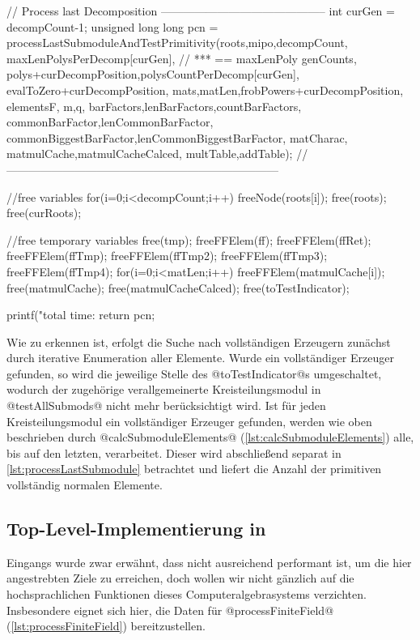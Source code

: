 \begin{ccode}[caption={Aus \url{../Sage/enumeratePCNs.c}},
  label=lst:processFiniteField]
{    // Process last Decomposition --------------------------------------------
    int curGen = decompCount-1;
    unsigned long long pcn = 
        processLastSubmoduleAndTestPrimitivity(roots,mipo,decompCount,
            maxLenPolysPerDecomp[curGen],  // *** == maxLenPoly
            genCounts,
            polys+curDecompPosition,polysCountPerDecomp[curGen],
            evalToZero+curDecompPosition,
            mats,matLen,frobPowers+curDecompPosition,
            elementsF,
            m,q,
            barFactors,lenBarFactors,countBarFactors,
            commonBarFactor,lenCommonBarFactor,
            commonBiggestBarFactor,lenCommonBiggestBarFactor,
            matCharac,
            matmulCache,matmulCacheCalced,
            multTable,addTable);
    //------------------------------------------------------------------------

    //free variables
    for(i=0;i<decompCount;i++)
        freeNode(roots[i]);
    free(roots); free(curRoots);

    //free temporary variables
    free(tmp);
    freeFFElem(ff);
    freeFFElem(ffRet);
    freeFFElem(ffTmp);
    freeFFElem(ffTmp2);
    freeFFElem(ffTmp3);
    freeFFElem(ffTmp4);
    for(i=0;i<matLen;i++) freeFFElem(matmulCache[i]);
    free(matmulCache);
    free(matmulCacheCalced);
    free(toTestIndicator);

    
    printf("total time: %
    return pcn;
}
\end{ccode}

Wie zu erkennen ist, erfolgt die Suche nach vollständigen Erzeugern zunächst
durch iterative Enumeration aller Elemente. Wurde ein vollständiger Erzeuger
gefunden, so wird die jeweilige Stelle des @toTestIndicator@s umgeschaltet,
wodurch der zugehörige verallgemeinerte Kreisteilungsmodul in 
@testAllSubmods@ nicht mehr berücksichtigt wird. Ist für jeden
Kreisteilungsmodul ein vollständiger Erzeuger gefunden, werden wie oben
beschrieben durch @calcSubmoduleElements@ (\autoref{lst:calcSubmoduleElements})
alle, bis auf den letzten, verarbeitet. Dieser wird abschließend separat in
\autoref{lst:processLastSubmodule}
betrachtet und liefert die Anzahl der primitiven vollständig normalen Elemente.


\subsection{Top-Level-Implementierung in \sage}

Eingangs wurde zwar erwähnt, dass \sage nicht ausreichend performant ist, um
die hier angestrebten Ziele zu erreichen, doch wollen wir nicht gänzlich auf
die hochsprachlichen Funktionen dieses Computeralgebrasystems verzichten.
Insbesondere eignet sich \sage hier, die Daten für
@processFiniteField@ (\autoref{lst:processFiniteField}) bereitzustellen.

